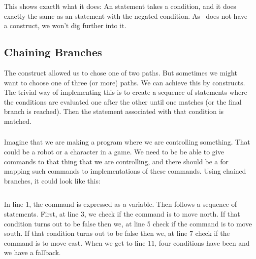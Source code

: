 This shows exactlt what it does: An  statement takes a condition, and it does exactly the same as an  statement with the negated condition. As \csharp\ does not have a  construct, we won't dig further into it.

\subsection{Chaining Branches}
\label{sec:flow:branch:chaining}

The  construct allowed us to chose one of two paths. But sometimes we might want to choose one of three (or more) paths. We can achieve this by   constructs. The trivial way of implementing this is to create a sequence of   statements where the conditions are evaluated one after the other until one matches (or the final  branch is reached). Then the statement associated with that condition is matched.

\subsubsection{\csharp}

Imagine that we are making a program where we are controlling something. That could be a robot or a character in a game. We need to be be able to give commands to that thing that we are controlling, and there should be a  for mapping such commands to implementations of these commands. Using chained branches, it could look like this:

\inputminted[linenos]{csharp}{../src/csharp/flow_branch/chain/Program.cs}

In line 1, the command is expressed as a  variable. Then follows a sequence of  statements. First, at line 3, we check if the command is to move north. If that condition turns out to be false then we, at line 5 check if the command is to move south. If that condition turns out to be false then we, at line 7 check if the command is to move east. When we get to line 11, four conditions have been  and we have a fallback.

